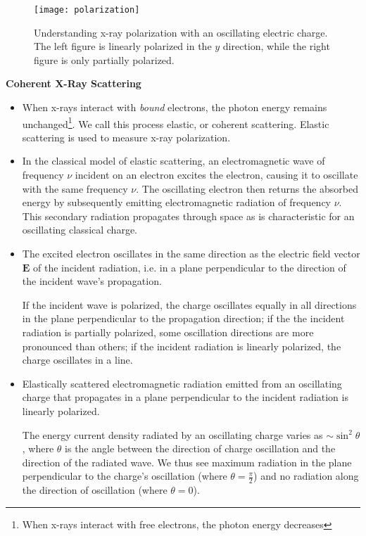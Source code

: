 \documentclass[11pt, a4paper]{article}
\begin{document}
\begin{figure}
\centering
\texttt{[image: polarization]}
\caption{Understanding x-ray polarization with an oscillating electric charge. The left figure is linearly polarized in the $ y $ direction, while the right figure is only partially polarized.}
\end{figure}


\textbf{Coherent X-Ray Scattering}
\begin{itemize}
	\item When x-rays interact with \textit{bound} electrons, the photon energy remains unchanged\footnote{When x-rays interact with free electrons, the photon energy decreases}. We call this process elastic, or coherent scattering. Elastic scattering is used to measure x-ray polarization. 
	
	\item In the classical model of elastic scattering, an electromagnetic wave of frequency $ \nu $ incident on an electron excites the electron, causing it to oscillate with the same frequency $ \nu $. The oscillating electron then returns the absorbed energy by subsequently emitting electromagnetic radiation of frequency $ \nu $. This secondary radiation propagates through space as is characteristic for an oscillating classical charge. 
	
	\item The excited electron oscillates in the same direction as the electric field vector $ \bm{E} $ of the incident radiation, i.e. in a plane perpendicular to the direction of the incident wave's propagation. 
	
	If the incident wave is polarized, the charge oscillates equally in all directions in the plane perpendicular to the propagation direction; if the the incident radiation is partially polarized, some oscillation directions are more pronounced than others; if the incident radiation is linearly polarized, the charge oscillates in a line.
	
	\item Elastically scattered electromagnetic radiation emitted from an oscillating charge that propagates in a plane perpendicular to the incident radiation is linearly polarized. 
	
	The energy current density radiated by an oscillating charge varies as $ \sim \sin^{2} \theta $, where $ \theta $ is the angle between the direction of charge oscillation and the direction of the radiated wave. We thus see maximum radiation in the plane perpendicular to the charge's oscillation (where $ \theta = \frac{\pi}{2} $) and no radiation along the direction of oscillation (where $ \theta = 0 $). 
	

\end{itemize}
\end{document}
